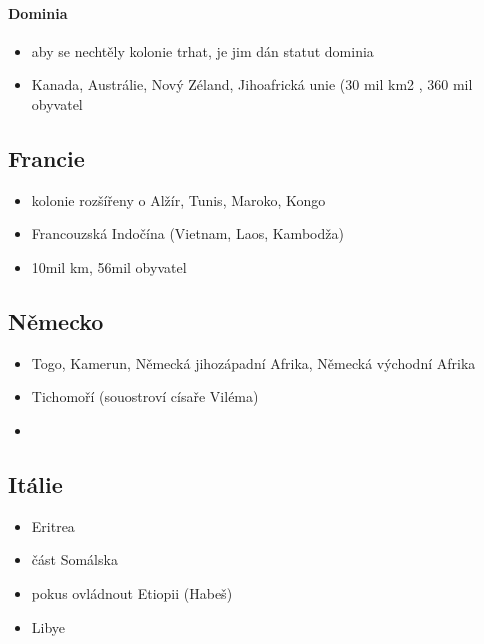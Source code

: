 \paragraph{Dominia}
\begin{itemize}
\item aby se nechtěly kolonie trhat, je jim dán statut dominia
\item Kanada, Austrálie, Nový Zéland, Jihoafrická unie (30 mil km2 , 360 mil obyvatel
\end{itemize}

\subsection{Francie}
\begin{itemize}
\item kolonie rozšířeny o Alžír, Tunis, Maroko, Kongo
\item Francouzská Indočína (Vietnam, Laos, Kambodža)
\item \ra 10mil km, 56mil obyvatel
\end{itemize}

\subsection{Německo}
\begin{itemize}
\item Togo, Kamerun, Německá jihozápadní Afrika, Německá východní Afrika
\item Tichomoří (souostroví císaře Viléma)
\item 
\end{itemize}


\subsection{Itálie}
\begin{itemize}
\item Eritrea
\item část Somálska
\item pokus ovládnout Etiopii (Habeš)
\item Libye
\end{itemize}

